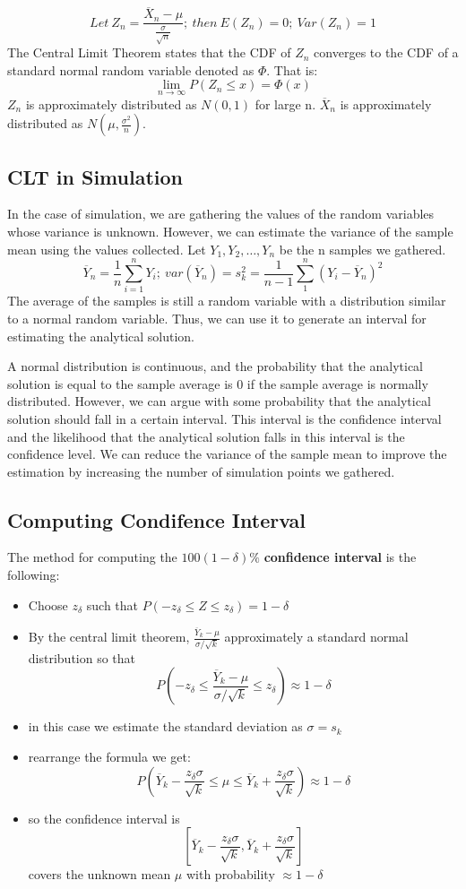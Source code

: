 \documentclass[11pt]{article}
\begin{document}
$$ Let \: Z_n = \frac{\overline{X}_n - \mu}{\frac{\sigma}{\sqrt{n}}}; \: then \: E(Z_n) = 0; \: Var(Z_n) = 1$$
The Central Limit Theorem states that the CDF of $Z_n$ converges to the CDF of a standard normal random variable denoted as $\Phi$.
That is: $$ \lim_{n \to \infty} P(Z_n \leq x) = \Phi(x)$$
$Z_n$ is approximately distributed as $N(0,1)$ for large n. $\overline{X}_n$ is approximately distributed as $N(\mu, \frac{\sigma^2}{n})$.

\subsection{CLT in Simulation}
In the case of simulation, we are gathering the values of the random variables whose variance is unknown.
However, we can estimate the variance of the sample mean using the values collected. 
Let $Y_1, Y_2, \ldots, Y_n$ be the n samples we gathered.
$$\overline{Y}_n = \frac{1}{n} \sum_{i=1}^{n}Y_i; \: var(\overline{Y}_n) = s_k^2 = \frac{1}{n-1} \sum_{1}^{n} (Y_i - \overline{Y}_n)^2 $$
The average of the samples is still a random variable with a distribution similar to a normal random variable. 
Thus, we can use it to generate an interval for estimating the analytical solution.

A normal distribution is continuous, and the probability that the analytical solution is equal to the sample average is 0 if the sample average is normally distributed.
However, we can argue with some probability that the analytical solution should fall in a certain interval. 
This interval is the confidence interval and the likelihood that the analytical solution falls in this interval is the confidence level.
We can reduce the variance of the sample mean to improve the estimation by increasing the number of simulation points we gathered. 

\subsection{Computing Condifence Interval}
The method for computing the $100(1-\delta)\% $ \textbf{confidence interval} is the following:
\begin{itemize}
  \item Choose $z_{\delta}$ such that $P(-z_{\delta} \leq Z \leq z_{\delta}) = 1 - \delta$
  \item By the central limit theorem, $\frac{\overline{Y}_k - \mu}{\sigma/\sqrt{k}} $ approximately a standard normal distribution so that 
  $$ P(-z_{\delta} \leq \frac{\overline{Y}_k - \mu}{\sigma/\sqrt{k}} \leq z_{\delta}) \approx 1 - \delta$$
  \item in this case we estimate the standard deviation as $\sigma = s_k$
  \item rearrange the formula we get:
  $$ P(\overline{Y}_k - \frac{ z_{\delta} \sigma}{ \sqrt{k} } \leq \mu \leq \overline{Y}_k + \frac{ z_{\delta} \sigma}{ \sqrt{k} } )  \approx 1 - \delta $$
  \item so the confidence interval is 
  $$[\overline{Y}_k - \frac{ z_{\delta} \sigma}{ \sqrt{k} } , \overline{Y}_k + \frac{ z_{\delta} \sigma}{ \sqrt{k} }  ]$$
  covers the unknown mean $\mu$ with probability $\approx 1 - \delta$
\end{itemize}
\end{document}
